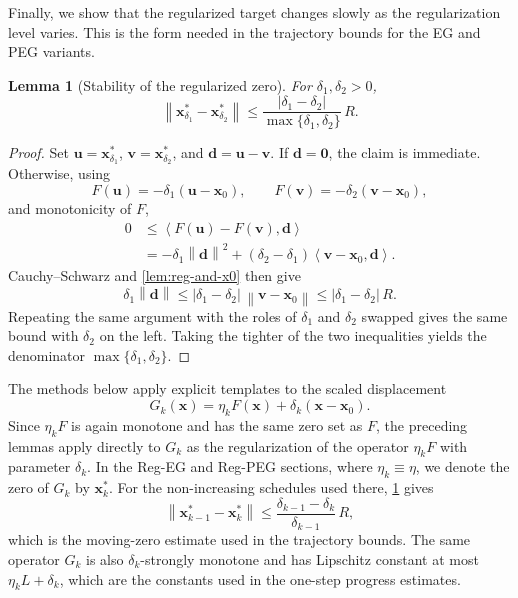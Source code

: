 \documentclass[letterpaper,11pt]{article}
\newcommand{\norm}[1]{\left\| #1 \right\|}
\newcommand{\angles}[1]{\left\langle #1 \right \rangle}
\newcommand{\vect}[1]{\mathbf{#1}}
\newtheorem{lemma}{Lemma}
\begin{document}
Finally, we show that the regularized target changes slowly as the
regularization level varies. This is the form needed in the trajectory bounds for the EG and
PEG variants.

\begin{lemma}[Stability of the regularized zero]\label{lem:stability-reg}
For \(\delta_1,\delta_2>0\),
\[
    \norm{\vect{x}_{\delta_1}^*-\vect{x}_{\delta_2}^*}
    \le
    \frac{|\delta_1-\delta_2|}{\max\{\delta_1,\delta_2\}}\,R.
\]
\end{lemma}
\begin{proof}
Set \(\vect{u}=\vect{x}_{\delta_1}^*\),
\(\vect{v}=\vect{x}_{\delta_2}^*\), and \(\vect{d}=\vect{u}-\vect{v}\). If
\(\vect{d}=\vect{0}\), the claim is immediate. Otherwise, using
\[
    F(\vect{u})=-\delta_1(\vect{u}-\vect{x}_0),
    \qquad
    F(\vect{v})=-\delta_2(\vect{v}-\vect{x}_0),
\]
and monotonicity of \(F\),
\[
\begin{aligned}
0
&\le
\angles{F(\vect{u})-F(\vect{v}),\vect{d}} \\
&=
-\delta_1\norm{\vect{d}}^2
+(\delta_2-\delta_1)\angles{\vect{v}-\vect{x}_0,\vect{d}}.
\end{aligned}
\]
Cauchy--Schwarz and \cref{lem:reg-and-x0} then give
\[
    \delta_1\norm{\vect{d}}
    \le
    |\delta_1-\delta_2|\,\norm{\vect{v}-\vect{x}_0}
    \le
    |\delta_1-\delta_2|\,R.
\]
Repeating the same argument with the roles of \(\delta_1\) and \(\delta_2\)
swapped gives the same bound with \(\delta_2\) on the left. Taking the tighter
of the two inequalities yields the denominator \(\max\{\delta_1,\delta_2\}\).
\end{proof}

The methods below apply explicit templates to the scaled displacement
\[
    G_k(\vect{x})
    =
    \eta_kF(\vect{x})+\delta_k(\vect{x}-\vect{x}_0).
\]
Since \(\eta_kF\) is again monotone and has the same zero set as \(F\), the
preceding lemmas apply directly to \(G_k\) as the regularization of the operator
\(\eta_kF\) with parameter \(\delta_k\). In the Reg-EG and Reg-PEG sections,
where \(\eta_k\equiv\eta\), we denote the zero of \(G_k\) by \(\vect{x}_k^*\).
For the non-increasing schedules used there, \cref{lem:stability-reg} gives
\[
    \norm{\vect{x}_{k-1}^*-\vect{x}_k^*}
    \le
    \frac{\delta_{k-1}-\delta_k}{\delta_{k-1}}\,R,
\]
which is the moving-zero estimate used in the trajectory bounds. The same
operator \(G_k\) is also \(\delta_k\)-strongly monotone and has Lipschitz
constant at most \(\eta_kL+\delta_k\), which are the constants used in the
one-step progress estimates.
\end{document}
